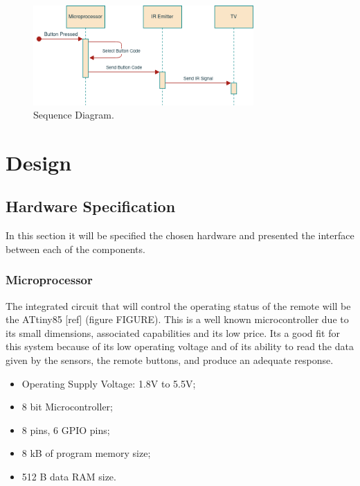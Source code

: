 \documentclass[12pt, letterpaper]{report}
\begin{document}
\begin{figure}[ht]
	\centering
	\includegraphics[width=0.75\textwidth]{SequeceDiagram}
	\caption{Sequence Diagram.}
	\label{fig:seq_diagram}
\end{figure}

\chapter{Design}
\section{Hardware Specification}
In this section it will be specified the chosen hardware and presented the interface between each of the components.

\subsection{Microprocessor}
The integrated circuit that will control the operating status of the remote will be the ATtiny85 [ref] (figure FIGURE). This is a well known microcontroller due to its small dimensions, associated capabilities and its low price. Its a good fit for this system because of its low operating voltage and of its ability to read the data given by the sensors, the remote buttons, and produce an adequate response.

\begin{itemize}
	\item Operating Supply Voltage: 1.8V to 5.5V;
	\item 8 bit Microcontroller;
	\item 8 pins, 6 GPIO pins;
	\item 8 kB of program memory size;
	\item 512 B data RAM size.
\end{itemize}
\end{document}
